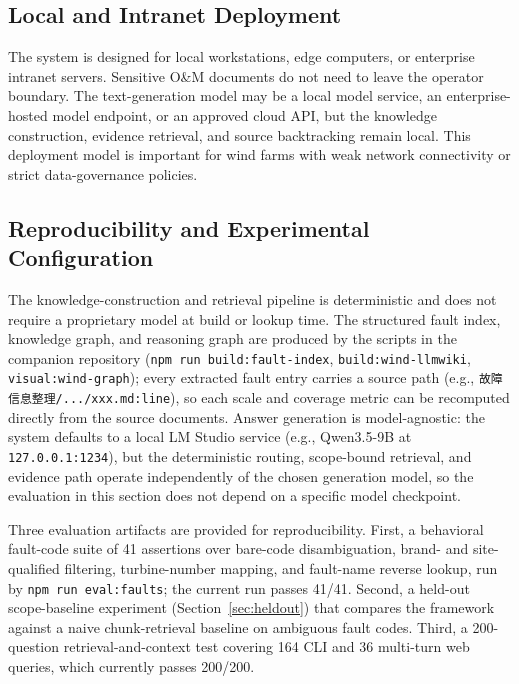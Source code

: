 \documentclass[lettersize,journal]{IEEEtran}
\begin{document}
\subsection{Local and Intranet Deployment}
The system is designed for local workstations, edge computers, or enterprise intranet servers. Sensitive O\&M documents do not need to leave the operator boundary. The text-generation model may be a local model service, an enterprise-hosted model endpoint, or an approved cloud API, but the knowledge construction, evidence retrieval, and source backtracking remain local. This deployment model is important for wind farms with weak network connectivity or strict data-governance policies.

\subsection{Reproducibility and Experimental Configuration}
\label{sec:repro}
The knowledge-construction and retrieval pipeline is deterministic and does not require a proprietary model at build or lookup time. The structured fault index, knowledge graph, and reasoning graph are produced by the scripts in the companion repository (\texttt{npm run build:fault-index}, \texttt{build:wind-llmwiki}, \texttt{visual:wind-graph}); every extracted fault entry carries a source path (e.g., \texttt{故障信息整理/.../xxx.md:line}), so each scale and coverage metric can be recomputed directly from the source documents. Answer generation is model-agnostic: the system defaults to a local LM Studio service (e.g., Qwen3.5-9B at \texttt{127.0.0.1:1234}), but the deterministic routing, scope-bound retrieval, and evidence path operate independently of the chosen generation model, so the evaluation in this section does not depend on a specific model checkpoint.

Three evaluation artifacts are provided for reproducibility. First, a behavioral fault-code suite of 41 assertions over bare-code disambiguation, brand- and site-qualified filtering, turbine-number mapping, and fault-name reverse lookup, run by \texttt{npm run eval:faults}; the current run passes 41/41. Second, a held-out scope-baseline experiment (Section~\ref{sec:heldout}) that compares the framework against a naive chunk-retrieval baseline on ambiguous fault codes. Third, a 200-question retrieval-and-context test covering 164 CLI and 36 multi-turn web queries, which currently passes 200/200.
\end{document}
